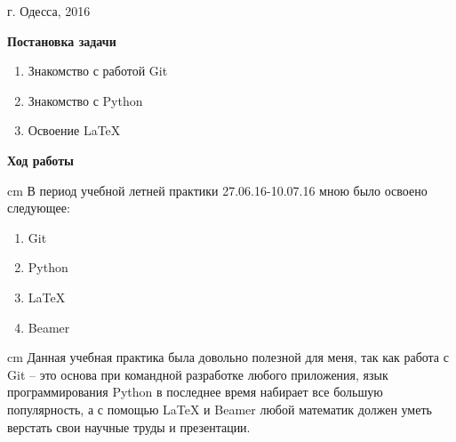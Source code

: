 \documentclass[12pt,a4paper]{scrartcl}
\begin{document}
\par\bigskip
\begin{center}
г. Одесса, 2016
\end{center}
\newpage
\begin{center}
\Large\textbf{Постановка задачи}
\end{center}
\begin{enumerate}
\item Знакомство с работой Git
\item Знакомство с Python
\item Освоение LaTeX
\end{enumerate}
\newpage
\begin{center}
\Large\textbf{Ход работы}
\end{center}
\parbox{14,5 cm}{ cm В период учебной летней практики 27.06.16-10.07.16 мною было освоено следующее:}
\begin{enumerate}
\item Git
\item Python
\item LaTeX
\item Beamer
\end{enumerate}
\parbox{14,5 cm}{ cm Данная учебная практика была довольно полезной для меня, так как работа с Git – это основа при командной разработке любого приложения, язык программирования Python в последнее время набирает все большую популярность, а с помощью LaTeX и Beamer любой математик должен уметь верстать свои научные труды и презентации. }
\end{document}
